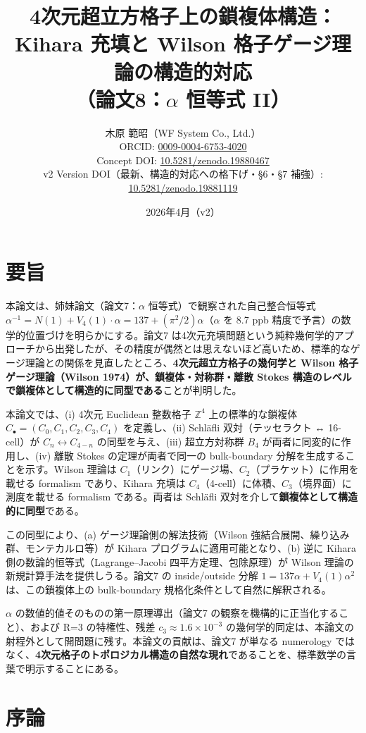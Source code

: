 \documentclass[a4paper,11pt]{ltjsarticle}
\title{4次元超立方格子上の鎖複体構造：\\Kihara 充填と Wilson 格子ゲージ理論の構造的対応\\（論文8：$\alpha$ 恒等式 II）}
\author{木原 範昭（WF System Co., Ltd.）\\ ORCID: \href{https://orcid.org/0009-0004-6753-4020}{0009-0004-6753-4020} \\ Concept DOI: \href{https://doi.org/10.5281/zenodo.19880467}{10.5281/zenodo.19880467} \\ v2 Version DOI（最新、構造的対応への格下げ・§6・§7 補強）: \href{https://doi.org/10.5281/zenodo.19881119}{10.5281/zenodo.19881119}}
\date{2026年4月（v2）}
\begin{document}
\maketitle

\section*{要旨}

本論文は、姉妹論文（論文7：$\alpha$ 恒等式）で観察された自己整合恒等式 $\alpha^{-1} = N(1) + V_4(1)\cdot\alpha = 137 + (\pi^2/2)\alpha$（$\alpha$ を 8.7 ppb 精度で予言）の数学的位置づけを明らかにする。論文7 は4次元充填問題という純粋幾何学的アプローチから出発したが、その精度が偶然とは思えないほど高いため、標準的なゲージ理論との関係を見直したところ、\textbf{4次元超立方格子の幾何学と Wilson 格子ゲージ理論（Wilson 1974）が、鎖複体・対称群・離散 Stokes 構造のレベルで鎖複体として構造的に同型である}ことが判明した。

本論文では、(i) 4次元 Euclidean 整数格子 $\mathbb{Z}^4$ 上の標準的な鎖複体 $C_\bullet = (C_0, C_1, C_2, C_3, C_4)$ を定義し、(ii) Schläfli 双対（テッセラクト ↔ 16-cell）が $C_n \leftrightarrow C_{4-n}$ の同型を与え、(iii) 超立方対称群 $B_4$ が両者に同変的に作用し、(iv) 離散 Stokes の定理が両者で同一の bulk-boundary 分解を生成することを示す。Wilson 理論は $C_1$（リンク）にゲージ場、$C_2$（プラケット）に作用を載せる formalism であり、Kihara 充填は $C_4$（4-cell）に体積、$C_3$（境界面）に測度を載せる formalism である。両者は Schläfli 双対を介して\textbf{鎖複体として構造的に同型}である。

この同型により、(a) ゲージ理論側の解法技術（Wilson 強結合展開、繰り込み群、モンテカルロ等）が Kihara プログラムに適用可能となり、(b) 逆に Kihara 側の数論的恒等式（Lagrange--Jacobi 四平方定理、包除原理）が Wilson 理論の新規計算手法を提供しうる。論文7 の inside/outside 分解 $1 = 137\alpha + V_4(1)\alpha^2$ は、この鎖複体上の bulk-boundary 規格化条件として自然に解釈される。

$\alpha$ の数値的値そのものの第一原理導出（論文7 の観察を機構的に正当化すること）、および R=3 の特権性、残差 $c_3 \approx 1.6 \times 10^{-3}$ の幾何学的同定は、本論文の射程外として開問題に残す。本論文の貢献は、論文7 が単なる numerology ではなく、\textbf{4次元格子のトポロジカル構造の自然な現れ}であることを、標準数学の言葉で明示することにある。

\section{序論}
\end{document}
